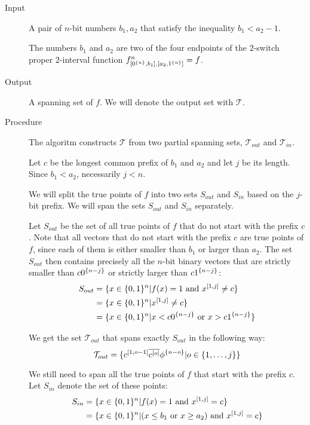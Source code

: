 \begin{description}
\item[Input] A pair of $n$-bit numbers $b_1, a_2$ that satisfy the inequality $b_1 < a_2 - 1$.

The numbers $b_1$ and $a_2$
are two of the four endpoints
of the $2$-switch proper $2$-interval
function $f^{n}_{[0^{\{n\}}, b_1], [a_2, 1^{\{n\}}]} = f$.

\item[Output] A spanning set of $f$.
We will denote the output set with $\mathcal{T}$.

\item[Procedure]
The algoritm constructs $\mathcal{T}$ from two partial spanning sets, $\mathcal{T}_{out}$ and $\mathcal{T}_{in}$.

Let $c$ be the longest common prefix of $b_1$ and $a_2$
and let $j$ be its length.
Since $b_1 < a_2$, necessarily $j < n$.

We will split the true points of $f$
into two sets $S_{out}$ and $S_{in}$
based on the $j$-bit prefix.
We will span the sets $S_{out}$ and $S_{in}$ separately.

Let $S_{out}$ be the set of all true points of $f$
that do not start with the prefix $c$.
Note that all vectors
that do not start with the prefix $c$
are true points of $f$,
since each of them is either smaller than $b_1$
or larger than $a_2$.
The set $S_{out}$ then contains precisely
all the $n$-bit binary vectors
that are strictly smaller than $c 0^{\{n-j\}}$
or strictly larger than $c 1^{\{n-j\}}$:
\begin{align*}
S_{out}
&= \{x \in \{0, 1\}^n
| f(x) = 1 \text{ and } x^{[1, j]} \neq c\} \\
&= \{x \in \{0, 1\}^n
| x^{[1, j]} \neq c\} \\
&= \{x \in \{0, 1\}^n
| x < c 0^{\{n-j\}} \text{ or } x > c 1^{\{n-j\}}\}
\end{align*}

We get the set $\mathcal{T}_{out}$ that spans exactly
$S_{out}$
in the following way:
$$
\mathcal{T}_{out} = \{c^{[1, o-1]} \overline{c^{[o]}} \phi^{\{n-o\}} | o \in \{1, \ldots, j\}\}
$$


We still need to span all the true points of $f$
that start with the prefix $c$.
Let $S_{in}$ denote the set of these points:
\begin{align*}
S_{in}
&= \{x \in \{0, 1\}^n
| f(x) = 1 \text{ and } x^{[1, j]} = c\} \\
&= \{x \in \{0, 1\}^n
| (x \leq b_1 \text{ or } x \geq a_2) \text{ and } x^{[1, j]} = c\}
\end{align*}


\end{description}
